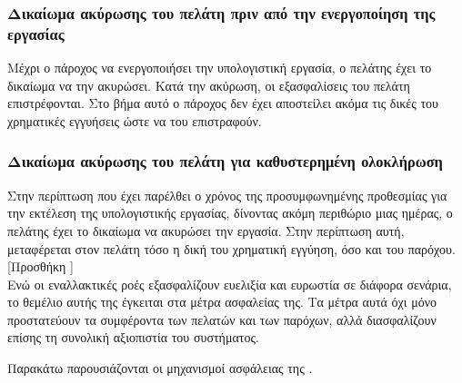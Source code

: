 \subsubsection{Δικαίωμα ακύρωσης του πελάτη πριν από την ενεργοποίηση της \\εργασίας}
Μέχρι ο πάροχος να ενεργοποιήσει την υπολογιστική εργασία, ο πελάτης έχει το δικαίωμα να την ακυρώσει. Κατά την ακύρωση, οι εξασφαλίσεις του πελάτη επιστρέφονται. Στο βήμα αυτό ο πάροχος δεν έχει αποστείλει ακόμα τις δικές του χρηματικές εγγυήσεις ώστε να του επιστραφούν.

\subsubsection{Δικαίωμα ακύρωσης του πελάτη για καθυστερημένη ολοκλήρωση}
Στην περίπτωση που έχει παρέλθει ο χρόνος της προσυμφωνημένης προθεσμίας για την εκτέλεση της υπολογιστικής εργασίας, δίνοντας ακόμη περιθώριο μιας ημέρας, ο πελάτης έχει το δικαίωμα να ακυρώσει την εργασία. Στην περίπτωση αυτή, μεταφέρεται στον πελάτη τόσο η δική του χρηματική εγγύηση, όσο και του παρόχου. \\

[Προσθήκη ]\\

Ενώ οι εναλλακτικές ροές εξασφαλίζουν ευελιξία και ευρωστία σε διάφορα σενάρια, το θεμέλιο αυτής της  έγκειται στα μέτρα ασφαλείας της. Τα μέτρα αυτά όχι μόνο προστατεύουν τα συμφέροντα των πελατών και των παρόχων, αλλά διασφαλίζουν επίσης τη συνολική αξιοπιστία του συστήματος. 

Παρακάτω παρουσιάζονται οι μηχανισμοί ασφάλειας της .




